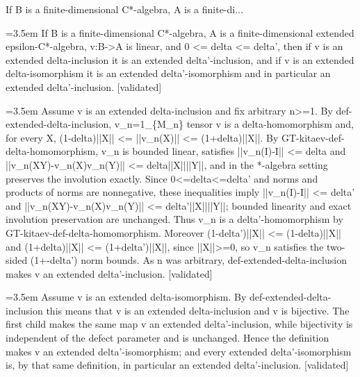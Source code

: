 \documentclass{article}
\newcommand{\step}[1]{\par\noindent\hangindent=3.5em\hangafter=1%
  \makebox[3.5em][l]{\textbf{#1.}}}
\newcommand{\steptag}[1]{\hfill{\small\textsf{[#1]}}}
\begin{document}
\begin{proofbox}{If B is a finite-dimensional C*-algebra, A is a finite-di...}
\step{1} If B is a finite-dimensional C*-algebra, A is a finite-dimensional extended epsilon-C*-algebra, v:B->A is linear, and 0 <= delta <= delta', then if v is an extended delta-inclusion it is an extended delta'-inclusion, and if v is an extended delta-isomorphism it is an extended delta'-isomorphism and in particular an extended delta'-inclusion. \steptag{validated} \\[6pt]
\step{1.1} Assume v is an extended delta-inclusion and fix arbitrary n>=1. By def-extended-delta-inclusion, v\_n=1\_\{M\_n\} tensor v is a delta-homomorphism and, for every X, (1-delta)||X|| <= ||v\_n(X)|| <= (1+delta)||X||. By GT-kitaev-def-delta-homomorphism, v\_n is bounded linear, satisfies ||v\_n(I)-I|| <= delta and ||v\_n(XY)-v\_n(X)v\_n(Y)|| <= delta||X||||Y||, and in the *-algebra setting preserves the involution exactly. Since 0<=delta<=delta' and norms and products of norms are nonnegative, these inequalities imply ||v\_n(I)-I|| <= delta' and ||v\_n(XY)-v\_n(X)v\_n(Y)|| <= delta'||X||||Y||; bounded linearity and exact involution preservation are unchanged. Thus v\_n is a delta'-homomorphism by GT-kitaev-def-delta-homomorphism. Moreover (1-delta')||X|| <= (1-delta)||X|| and (1+delta)||X|| <= (1+delta')||X||, since ||X||>=0, so v\_n satisfies the two-sided (1+-delta') norm bounds. As n was arbitrary, def-extended-delta-inclusion makes v an extended delta'-inclusion. \steptag{validated} \\[4pt]
\step{1.2} Assume v is an extended delta-isomorphism. By def-extended-delta-inclusion this means that v is an extended delta-inclusion and v is bijective. The first child makes the same map v an extended delta'-inclusion, while bijectivity is independent of the defect parameter and is unchanged. Hence the definition makes v an extended delta'-isomorphism; and every extended delta'-isomorphism is, by that same definition, in particular an extended delta'-inclusion. \steptag{validated} \\[4pt]
\end{proofbox}
\end{document}
